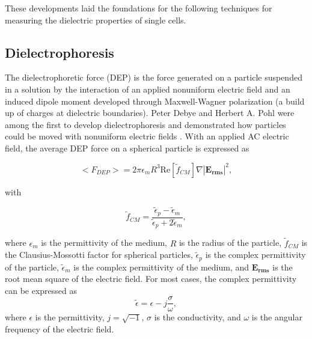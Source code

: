  
 \par These developments laid the foundations for the following techniques for measuring the dielectric properties of single cells. 
 
 \label{sec:dielectrophoresis}
 \subsection{Dielectrophoresis}
 \par The dielectrophoretic force (DEP) is the force generated on a particle suspended in a solution by the interaction of an applied nonuniform electric field and an induced dipole moment developed through Maxwell-Wagner polarization (a build up of charges at dielectric boundaries). Peter Debye and Herbert A. Pohl were among the first to develop dielectrophoresis and demonstrated how particles could be moved with nonuniform electric fields \cite{muller_potential_2003}. With an applied AC electric field, the average DEP force on a spherical particle is expressed as \cite{morgan_single_2007, green_dielectrophoresis_1999}
 
 \begin{equation}
     \big< F_{DEP} \big> = 2\pi \epsilon_m R^3 \text{Re}[\tilde{f}_{CM}] \nabla |\textbf{E}_\textbf{rms}|^2, 
     \label{eqn:dep_force}
 \end{equation}
 
 \noindent with
 
 \begin{equation}
     \tilde{f}_{CM} = \frac{\tilde{\epsilon}_p - \tilde{\epsilon}_m}{\tilde{\epsilon}_p + 2\tilde{\epsilon}_m}, 
     \label{eqn:fcm_background}
 \end{equation}
 
 \noindent where $\epsilon_m$ is the permittivity of the medium, $R$ is the radius of the particle, $\tilde{f}_{CM}$ is the Clausius-Mossotti factor for spherical particles,  $\tilde{\epsilon}_p$ is the complex permittivity of the particle, $\tilde{\epsilon}_m$ is the complex permittivity of the medium, and $\textbf{E}_\textbf{rms}$ is the root mean square of the electric field. For most cases, the complex permittivity can be expressed as 
 \begin{equation}
     \tilde{\epsilon} = \epsilon - j\frac{\sigma}{\omega},
 \end{equation}
\noindent where $\epsilon$ is the permittivity, $j = \sqrt{-1}$, $\sigma$ is the conductivity, and $\omega$ is the angular frequency of the electric field. 

